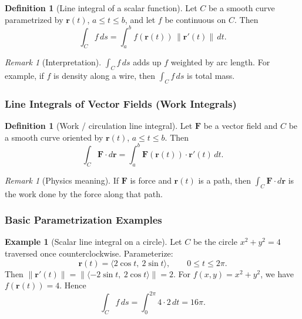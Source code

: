 \documentclass[12pt]{article}
\numberwithin{equation}{section}
\newcommand{\vect}[1]{\boldsymbol{#1}}   %
\newcommand{\norm}[1]{\left\lVert #1\right\rVert}
\theoremstyle{plain}
\theoremstyle{definition}
\newtheorem{definition}[theorem]{Definition}
\newtheorem{example}[theorem]{Example}
\theoremstyle{remark}
\newtheorem{remark}[theorem]{Remark}
\begin{document}
\begin{definition}[Line integral of a scalar function]\label{def:line-scalar}
Let $C$ be a smooth curve parametrized by $\vect r(t)$, $a\le t\le b$, and let $f$ be continuous on $C$. Then
\begin{equation}\label{eq:line-scalar}
\int_C f\,ds = \int_a^b f(\vect r(t))\,\norm{\vect r'(t)}\,dt.
\end{equation}
\end{definition}

\begin{remark}[Interpretation]
$\int_C f\,ds$ adds up $f$ weighted by arc length. For example, if $f$ is density along a wire, then $\int_C f\,ds$ is total mass.
\end{remark}

\subsubsection{Line Integrals of Vector Fields (Work Integrals)}

\begin{definition}[Work / circulation line integral]\label{def:line-work}
Let $\vect F$ be a vector field and $C$ be a smooth curve oriented by $\vect r(t)$, $a\le t\le b$. Then
\begin{equation}\label{eq:line-work}
\int_C \vect F\cdot d\vect r
=
\int_a^b \vect F(\vect r(t))\cdot \vect r'(t)\,dt.
\end{equation}
\end{definition}

\begin{remark}[Physics meaning]
If $\vect F$ is force and $\vect r(t)$ is a path, then $\int_C \vect F\cdot d\vect r$ is the work done by the force along that path.
\end{remark}

\subsubsection{Basic Parametrization Examples}

\begin{example}[Scalar line integral on a circle]
Let $C$ be the circle $x^2+y^2=4$ traversed once counterclockwise. Parameterize:
\[
\vect r(t)=\langle 2\cos t,\ 2\sin t\rangle,\qquad 0\le t\le 2\pi.
\]
Then $\norm{\vect r'(t)}=\norm{\langle -2\sin t,\ 2\cos t\rangle}=2$.  
For $f(x,y)=x^2+y^2$, we have $f(\vect r(t))=4$. Hence
\[
\int_C f\,ds=\int_0^{2\pi} 4\cdot 2\,dt = 16\pi.
\]
\end{example}
\end{document}
